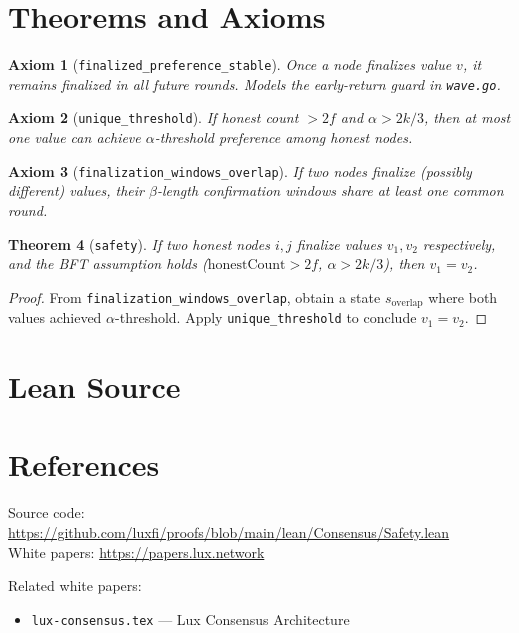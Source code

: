 \documentclass[11pt]{article}
\newtheorem{theorem}{Theorem}
\newtheorem{axiom_stmt}[theorem]{Axiom}
\begin{document}
\section{Theorems and Axioms}
\begin{axiom_stmt}[\texttt{finalized\_preference\_stable}]
Once a node finalizes value $v$, it remains finalized in all future rounds. Models the early-return guard in \texttt{wave.go}.
\end{axiom_stmt}

\begin{axiom_stmt}[\texttt{unique\_threshold}]
If honest count $> 2f$ and $\alpha > 2k/3$, then at most one value can achieve $\alpha$-threshold preference among honest nodes.
\end{axiom_stmt}

\begin{axiom_stmt}[\texttt{finalization\_windows\_overlap}]
If two nodes finalize (possibly different) values, their $\beta$-length confirmation windows share at least one common round.
\end{axiom_stmt}

\begin{theorem}[\texttt{safety}]
If two honest nodes $i, j$ finalize values $v_1, v_2$ respectively, and the BFT assumption holds ($\text{honestCount} > 2f$, $\alpha > 2k/3$), then $v_1 = v_2$.
\end{theorem}
\begin{proof}
From \texttt{finalization\_windows\_overlap}, obtain a state $s_{\text{overlap}}$ where both values achieved $\alpha$-threshold. Apply \texttt{unique\_threshold} to conclude $v_1 = v_2$.
\end{proof}


\section{Lean Source}


\section{References}
\noindent Source code: \url{https://github.com/luxfi/proofs/blob/main/lean/Consensus/Safety.lean}\\
\noindent White papers: \url{https://papers.lux.network}

\noindent Related white papers:
\begin{itemize}
  \item \texttt{lux-consensus.tex} --- Lux Consensus Architecture
\end{itemize}
\end{document}

